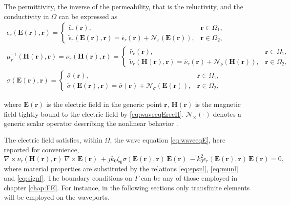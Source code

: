The permittivity, the inverse of the permeability, that is the reluctivity, and the conductivity in $\Omega$ can be expressed as 
%
\begin{gather}
\epsilon_r(\mathbf{E}(\mathbf{r}),\mathbf{r}) = 
\begin{cases}
\bar{\epsilon}_r(\mathbf{r}), & \mathbf{r} \in \Omega_1,  \\
\tilde{\epsilon}_r(\mathbf{E}(\mathbf{r}), \mathbf{r}) \!=\!
\bar{\epsilon}_r(\mathbf{r}) \!+\! \mathcal{N}_\epsilon(\mathbf{E}(\mathbf{r})), & \mathbf{r} \in
\Omega_2,
\end{cases} \label{eq:epsnl}\\
\mu_r^{-1}(\mathbf{H}(\mathbf{r}),\mathbf{r}) = \nu_r(\mathbf{H}(\mathbf{r}),\mathbf{r}) = 
\begin{cases}
\bar{\nu}_r(\mathbf{r}), & \mathbf{r} \in \Omega_1, \\
\tilde{\nu}_r(\mathbf{H}(\mathbf{r}), \mathbf{r}) \!=\!
\bar{\nu}_r(\mathbf{r}) \!+\! \mathcal{N}_\nu(\mathbf{H}(\mathbf{r})), & \mathbf{r} \in
\Omega_2,
\end{cases}\label{eq:munl}\\
\sigma(\mathbf{E}(\mathbf{r}),\mathbf{r}) = 
\begin{cases}
\bar{\sigma}(\mathbf{r}), & \mathbf{r} \in \Omega_1, \\
\tilde{\sigma}(\mathbf{E}(\mathbf{r}), \mathbf{r}) \!=\!
\bar{\sigma}(\mathbf{r}) \!+\! \mathcal{N}_\sigma(\mathbf{E}(\mathbf{r})), & \mathbf{r} \in
\Omega_2,
\end{cases}\label{eq:signl}
\end{gather}

\noindent where $\mathbf{E}(\mathbf{r})$ is the electric field in the generic point
$\mathbf{r}$, $\mathbf{H}(\mathbf{r})$ is the magnetic field tightly bound to the electric field by \eqref{eq:waveeqErecH}. $\mathcal{N}_\times(\cdot)$ denotes a generic scalar operator describing the nonlinear behavior \cite{Guarnieri2010}. 

The electric field satisfies, within $\Omega$, the wave equation \eqref{eq:waveeqE}, here reported for convenience,
\begin{equation}
\nabla \times \nu_r(\mathbf{H}(\mathbf{r}),\mathbf{r}) \ \nabla \times {\mathbf{E}(\mathbf{r})} \ + j k_0 \zeta_0 \sigma(\mathbf{E}(\mathbf{r}),\mathbf{r}) \ {\mathbf{E}(\mathbf{r})} \ - k_0^2 \epsilon_r(\mathbf{E}(\mathbf{r}),\mathbf{r}) \ {\mathbf{E}(\mathbf{r})} = 0,\label{eq:waveeqEnl}
\end{equation}
\noindent where material properties are substituted by the relations \eqref{eq:epsnl}, \eqref{eq:munl} and \eqref{eq:signl}. The boundary conditions on $\Gamma$ can be any of those employed in chapter \ref{chap:FE}. For instance, in the following sections only transfinite elements will be employed on the waveports.

